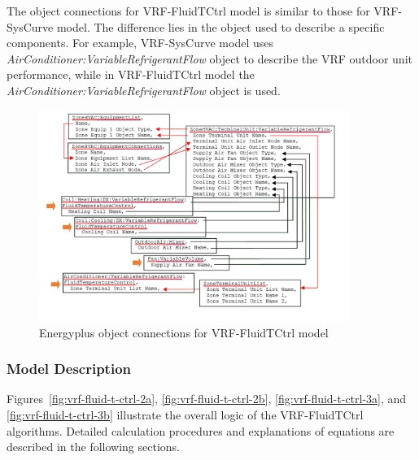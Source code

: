 The object connections for VRF-FluidTCtrl model is similar to those for VRF-SysCurve model. The difference lies in the object used to describe a specific components. For example, VRF-SysCurve model uses \emph{AirConditioner:VariableRefrigerantFlow} object to describe the VRF outdoor unit performance, while in VRF-FluidTCtrl model the \emph{AirConditioner:VariableRefrigerantFlow} object is used.

\begin{figure}[hbtp] %
\centering
\includegraphics[width=0.9\textwidth, height=0.9\textheight, keepaspectratio=true]{media/VRF-FluidTCtrl-1b.png}
\caption{Energyplus object connections for VRF-FluidTCtrl model \label{fig:energyplus-object-connections-for-vrf-fluidtctrl-model}}
\end{figure}

\subsubsection{Model Description}\label{vrf-heat-pump-model description}

Figures~\ref{fig:vrf-fluid-t-ctrl-2a}, \ref{fig:vrf-fluid-t-ctrl-2b}, \ref{fig:vrf-fluid-t-ctrl-3a}, and \ref{fig:vrf-fluid-t-ctrl-3b} illustrate the overall logic of the VRF-FluidTCtrl algorithms. Detailed calculation procedures and explanations of equations are described in the following sections.

